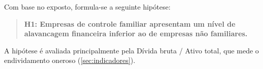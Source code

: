 Com base no exposto, formula-se a seguinte hipótese:

\begin{quote}
\textbf{H1: Empresas de controle familiar apresentam um nível de alavancagem
financeira inferior ao de empresas não familiares.}
\end{quote}

A hipótese é avaliada principalmente pela Dívida bruta / Ativo total, que mede o
endividamento oneroso (\autoref{sec:indicadores}).

